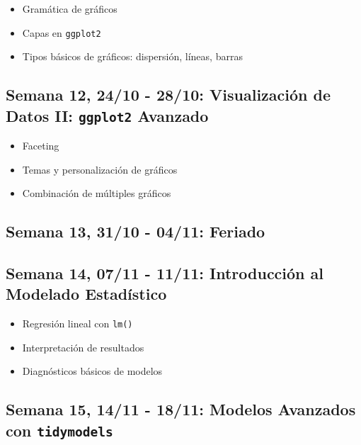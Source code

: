 \documentclass[11pt,letter,]{article}
\providecommand{\tightlist}{%
  \setlength{\itemsep}{0pt}\setlength{\parskip}{0pt}}
\begin{document}
\begin{itemize}
\tightlist
\item
  Gramática de gráficos
\item
  Capas en \texttt{ggplot2}
\item
  Tipos básicos de gráficos: dispersión, líneas, barras
\end{itemize}

\hypertarget{semana-12-2410---2810-visualizaciuxf3n-de-datos-ii-ggplot2-avanzado}{%
\subsection{\texorpdfstring{Semana 12, 24/10 - 28/10: Visualización de
Datos II: \texttt{ggplot2}
Avanzado}{Semana 12, 24/10 - 28/10: Visualización de Datos II: ggplot2 Avanzado}}\label{semana-12-2410---2810-visualizaciuxf3n-de-datos-ii-ggplot2-avanzado}}

\begin{itemize}
\tightlist
\item
  Faceting
\item
  Temas y personalización de gráficos
\item
  Combinación de múltiples gráficos
\end{itemize}

\hypertarget{semana-13-3110---0411-feriado}{%
\subsection{Semana 13, 31/10 - 04/11:
Feriado}\label{semana-13-3110---0411-feriado}}

\hypertarget{semana-14-0711---1111-introducciuxf3n-al-modelado-estaduxedstico}{%
\subsection{Semana 14, 07/11 - 11/11: Introducción al Modelado
Estadístico}\label{semana-14-0711---1111-introducciuxf3n-al-modelado-estaduxedstico}}

\begin{itemize}
\tightlist
\item
  Regresión lineal con \texttt{lm()}
\item
  Interpretación de resultados
\item
  Diagnósticos básicos de modelos
\end{itemize}

\hypertarget{semana-15-1411---1811-modelos-avanzados-con-tidymodels}{%
\subsection{\texorpdfstring{Semana 15, 14/11 - 18/11: Modelos Avanzados
con
\texttt{tidymodels}}{Semana 15, 14/11 - 18/11: Modelos Avanzados con tidymodels}}\label{semana-15-1411---1811-modelos-avanzados-con-tidymodels}}
\end{document}
